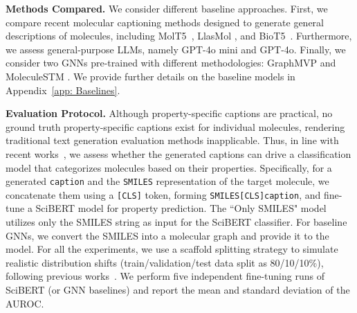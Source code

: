\textbf{Methods Compared.}
We consider different baseline approaches. 
First, we compare recent molecular captioning methods designed to generate general descriptions of molecules, including MolT5~\cite{edwards2022translation}, LlasMol \cite{yu2024llasmol}, and BioT5~\cite{pei2023biot5}. Furthermore, we assess general-purpose LLMs, namely GPT-4o mini and GPT-4o.
Finally, we consider two GNNs pre-trained with different methodologies: GraphMVP \cite{liu2021pre} and MoleculeSTM \cite{liu2023multi}. 
We provide further details on the baseline models in Appendix~\ref{app: Baselines}.


\textbf{Evaluation Protocol.}
Although property-specific captions are practical, no ground truth property-specific captions exist for individual molecules, rendering traditional text generation evaluation methods inapplicable.
Thus, in line with recent works~\cite{xu2024llm,guo2024moltailor,edwards2024molcap}, we assess whether the generated captions can drive a classification model that categorizes molecules based on their properties.
Specifically, for a generated \texttt{caption} and the \texttt{SMILES} representation of the target molecule, we concatenate them using a \texttt{[CLS]} token, forming \texttt{SMILES[CLS]caption}, and fine-tune a SciBERT \cite{beltagy2019scibert} model for property prediction.
The ``Only SMILES" model utilizes only the SMILES string as input for the SciBERT classifier.
For baseline GNNs, we convert the SMILES into a molecular graph and provide it to the model.
For all the experiments, we use a scaffold splitting strategy to simulate realistic distribution shifts (train/validation/test data split as 80/10/10\%), following previous works~\cite{liu2023multi}.
We perform five independent fine-tuning runs of SciBERT (or GNN baselines) and report the mean and standard deviation of the AUROC.

